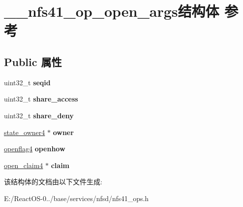 \hypertarget{struct____nfs41__op__open__args}{}\section{\+\_\+\+\_\+nfs41\+\_\+op\+\_\+open\+\_\+args结构体 参考}
\label{struct____nfs41__op__open__args}
\subsection*{Public 属性}
\begin{DoxyCompactItemize}
\item 
\mbox{\label{struct____nfs41__op__open__args_a373d913229b2149fdd70ab05f3338684}} 
uint32\+\_\+t {\bfseries seqid}
\item 
\mbox{\label{struct____nfs41__op__open__args_a1094fc678963cc845c7e55930d275fc9}} 
uint32\+\_\+t {\bfseries share\+\_\+access}
\item 
\mbox{\label{struct____nfs41__op__open__args_a6c26668c9ddd659abc0561ea8d09377f}} 
uint32\+\_\+t {\bfseries share\+\_\+deny}
\item 
\mbox{\label{struct____nfs41__op__open__args_a03216eea8ba292e5f5d87ecc5978421a}} 
\hyperlink{struct____state__owner4}{state\+\_\+owner4} $\ast$ {\bfseries owner}
\item 
\mbox{\label{struct____nfs41__op__open__args_ad779bc77db3ab1f296a597dcb434fb83}} 
\hyperlink{struct____openflag4}{openflag4} {\bfseries openhow}
\item 
\mbox{\label{struct____nfs41__op__open__args_ac738ea837f63334fcd69b3c0085df9d9}} 
\hyperlink{struct____open__claim4}{open\+\_\+claim4} $\ast$ {\bfseries claim}
\end{DoxyCompactItemize}


该结构体的文档由以下文件生成\+:\begin{DoxyCompactItemize}
\item 
E\+:/\+React\+O\+S-\/0../base/services/nfsd/nfs41\+\_\+ops.\+h\end{DoxyCompactItemize}

